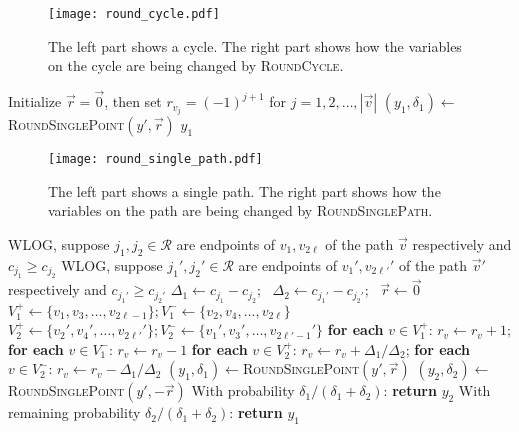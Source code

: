 \documentclass[a4paper,11pt]{article}
\newcommand{\R}{\mathcal{R}}
\begin{document}
\begin{figure}[H]
\centering
\texttt{[image: round\_cycle.pdf]}
\caption{The left part shows a cycle. The right part shows how the variables on the cycle are being changed by \textsc{RoundCycle}.}
\label{fig:cycle}
\end{figure}

\begin{algorithm}[H]
\caption{$\textsc{RoundSinglePath}\left(y', \vec{v} \right)$}
\begin{algorithmic}[1]
\STATE Initialize $\vec{r} = \vec{0}$, then set $r_{v_j} = (-1)^{j+1}$ for $j = 1,2, \ldots, |\vec{v}|$
\STATE $(y_1, \delta_1) \gets$\textsc{RoundSinglePoint}$(y', \vec{r})$
\RETURN $y_1$
\end{algorithmic} 
\label{algo:round_single_path}
\end{algorithm}

\begin{figure}[H]
\centering
\texttt{[image: round\_single\_path.pdf]}
        \caption{The left part shows a single path. The right part shows how the variables on the path are being changed by \textsc{RoundSinglePath}.}
        \label{fig:single_path}
\end{figure}

\begin{algorithm}[H]
\caption{$\textsc{RoundTwoPaths}\left(y', \vec{v}, \vec{v}', \vec{c} \right)$}
\begin{algorithmic}[1]
\STATE WLOG, suppose $j_1, j_2 \in \R$ are endpoints of $v_1, v_{2\ell}$ of the path $\vec{v}$ respectively and $c_{j_1} \geq c_{j_2}$
\STATE WLOG, suppose $j_1', j_2' \in \R$ are endpoints of $v_1', v_{2\ell'}'$ of the path $\vec{v}'$ respectively and $c_{j_1'} \geq c_{j_2'}$
\STATE $\Delta_1 \gets c_{j_1} - c_{j_2};~~~ \Delta_2  \gets c_{j_1'} - c_{j_2'};~~~ \vec{r} \gets \vec{0}$ 
\STATE $V_1^+ \gets \{v_1, v_3, \ldots, v_{2\ell-1} \}; V_1^- \gets \{v_2, v_4, \ldots, v_{2\ell}\}$
\STATE $V_2^+ \gets \{v_2', v_4', \ldots, v_{2\ell'}'\}; V_2^- \gets \{v_1', v_3', \ldots, v_{2\ell'-1}' \}$
\STATE \textbf{for each} $v \in V_1^+$: $r_v \gets r_v + 1$; \textbf{for each} $v \in V_1^-$: $r_v \gets r_v - 1$
\STATE \textbf{for each} $v \in V_2^+$: $r_v \gets r_v + \Delta_1/\Delta_2$; \textbf{for each} $v \in V_2^-$: $r_v \gets r_v - \Delta_1/\Delta_2$
\STATE $(y_1, \delta_1) \gets $\textsc{RoundSinglePoint}$(y', \vec{r})$
\STATE $(y_2, \delta_2) \gets $\textsc{RoundSinglePoint}$(y', -\vec{r})$
\STATE With probability $\delta_1 / (\delta_1+\delta_2)$: \textbf{return} $y_2$
\STATE With remaining probability $\delta_2 / (\delta_1+\delta_2)$: \textbf{return} $y_1$
\end{algorithmic} 
\label{algo:round_two_paths}
\end{algorithm}
\end{document}
